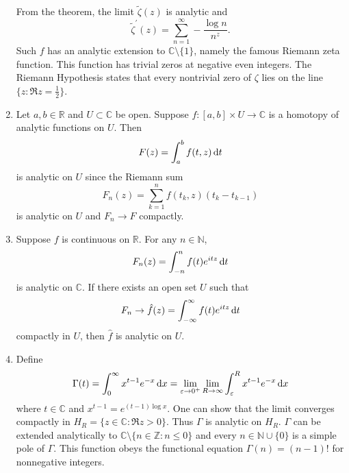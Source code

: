 \begin{xmpl}
\begin{enumerate}
{      From the theorem, the limit $\tilde{\zeta}(z)$ is analytic and
      $$
        \tilde{\zeta}^\prime(z)
      = \sum_{n=1}^\infty
          -\frac{\log n}{n^z}.
      $$
      Such $f$ has an analytic extension to
      $\mathbb{C} \setminus \{ 1 \}$, namely the famous Riemann zeta
      function. This function has trivial zeros at negative even
      integers. The Riemann Hypothesis states that every nontrivial
      zero of $\zeta$ lies on the line $\{ z : \Re z = \frac{1}{2} \}$.
    }
    \item{
      Let $a, b \in \mathbb{R}$ and $U \subset \mathbb{C}$ be open.
      Suppose $f : [a, b] \times U \to \mathbb{C}$ is a homotopy of
      analytic functions on $U$. Then
      $$
      F(z) = \int_a^b f(t, z) \mathop{}\!\mathrm{d} t
      $$
      is analytic on $U$ since the Riemann sum
      $$
        F_n(z)
      = \sum_{k=1}^n
          f(t_k, z)
          (t_k - t_{k-1})
      $$
      is analytic on $U$ and $F_n \to F$ compactly.
    }
    \item{
      Suppose $f$ is continuous on $\mathbb{R}$.
      For any $n \in \mathbb{N}$,
      $$
        F_n(z)
      = \int_{-n}^n
          f(t) e^{i t z}
          \mathop{}\!\mathrm{d} t
      $$
      is analytic on $\mathbb{C}$. If there exists an open set $U$
      such that
      $$
          F_n
      \to \hat{f}(z)
      =   \int_{-\infty}^{\infty}
            f(t) e^{i t z}
            \mathop{}\!\mathrm{d} t
      $$
      compactly in $U$, then $\hat{f}$ is analytic on $U$.
    }
    \item{
      Define
      $$
        \Gamma(t)
      = \int_0^\infty
          x^{t-1}
          e^{-x}
          \mathop{}\!\mathrm{d} x
      = \lim_{\varepsilon \to 0^+}
        \lim_{R \to \infty}
        \int_\varepsilon^R
          x^{t-1}
          e^{-x}
          \mathop{}\!\mathrm{d} x
      $$
      where $t \in \mathbb{C}$ and
      $x^{t-1} = e^{(t-1)\log x}$. One can show that the limit
      converges compactly in
      $H_R = \{z \in \mathbb{C} : \Re z > 0\}$. Thus
      $\Gamma$ is analytic on $H_R$. $\Gamma$ can be extended
      analytically to
      $\mathbb{C} \setminus \{ n \in \mathbb{Z} : n \leq 0 \}$
      and every $n \in \mathbb{N} \cup \{ 0 \}$ is a simple pole
      of $\Gamma$. This function obeys the functional equation
      $\Gamma(n) = (n - 1)!$ for nonnegative integers.
    }
  \end{enumerate}
\end{xmpl}

